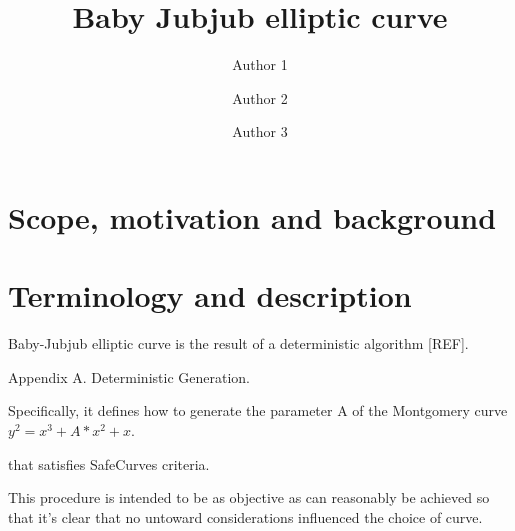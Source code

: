 \documentclass{article}
\title{ Baby Jubjub elliptic curve \vspace{-0.2cm} }
\author[1]{Author 1}
\author[2]{Author 2}
\author[1]{Author 3}
\affil[1]{Affiliation 1}
\affil[2]{Affiliation 2}
\date{} %
\begin{document}
\maketitle 
\vspace{1cm}
\tableofcontents

\vspace{0.5cm}


\section{Scope, motivation and background}	

\section{Terminology and description}

%


Baby-Jubjub elliptic curve is the result of a deterministic algorithm [REF]. 

Appendix A.  Deterministic Generation. 

Specifically, it defines how to generate the parameter
A of the Montgomery curve $y^2 = x^3 + A*x^2 + x$.  

that satisfies SafeCurves criteria.

This procedure is
intended to be as objective as can reasonably be achieved so that
it's clear that no untoward considerations influenced the choice of
curve.  
\end{document}
